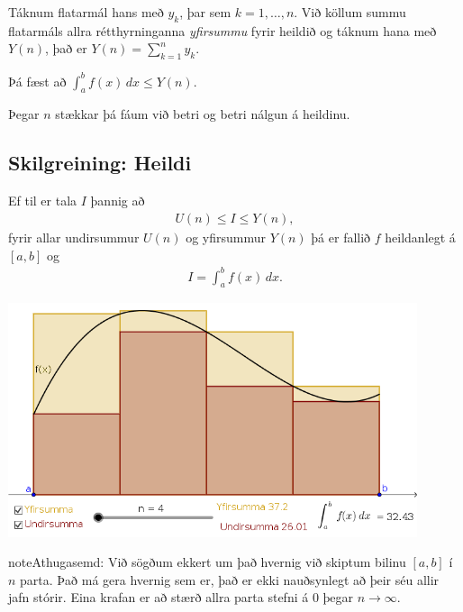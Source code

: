 \documentclass[b5paper,10pt,icelandic]{sphinxmanual}
\begin{document}

Táknum flatarmál hans með \(y_k\), þar sem \(k=1,\ldots,n\). Við
köllum summu flatarmáls allra rétthyrninganna \textit{yfirsummu} fyrir heildið
og táknum hana með \(Y(n)\), það er \(Y(n) = \sum_{k=1}^n y_k\).

Þá fæst að \(\int_a^b f(x)\, dx \leq Y(n)\).

Þegar \(n\) stækkar þá fáum við betri og betri nálgun á heildinu.


\subsection{Skilgreining: Heildi}
\label{\detokenize{kafli06:skilgreining-heildi}}
Ef til er  tala \(I\) þannig að
\begin{equation*}
\begin{split}U(n) \leq I \leq Y(n),\end{split}
\end{equation*}
fyrir allar undirsummur \(U(n)\) og yfirsummur \(Y(n)\) þá er
fallið \(f\) heildanlegt á \([a,b]\) og
\begin{equation*}
\begin{split}I = \int_a^b f(x)\, dx.\end{split}
\end{equation*}

\begin{center}
\includegraphics[width=12cm,keepaspectratio=true]{./03_undirogyfirsumma.png}
\end{center}


\begin{sphinxadmonition}{note}{Athugasemd:}
Við sögðum ekkert um það hvernig við skiptum bilinu \([a,b]\) í
\(n\) parta. Það má gera hvernig sem er, það er ekki nauðsynlegt að
þeir séu allir jafn stórir. Eina krafan er að stærð allra parta stefni á
0 þegar \(n\to \infty\).
\end{sphinxadmonition}
\end{document}
